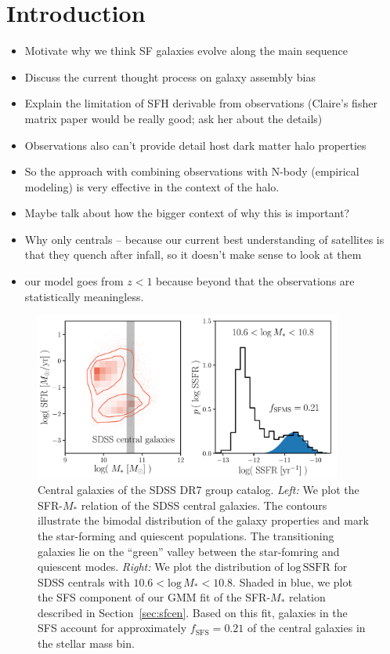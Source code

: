 \documentclass[12pt, letterpaper, preprint]{aastex}
\newcommand{\bitem}{\begin{itemize}}
\newcommand{\eitem}{\end{itemize}}
\begin{document}
\section{Introduction}
\bitem 
\item Motivate why we think SF galaxies evolve along the main sequence  
\item Discuss the current thought process on galaxy assembly bias 
\item Explain the limitation of SFH derivable from observations (Claire's fisher matrix paper would be really good; ask her about the details) 
\item Observations also can't provide detail host dark matter halo properties
\item So the approach with combining observations with N-body (empirical modeling) is very effective in the context of the halo.
\item Maybe talk about how the bigger context of why this is important?  
\item Why only centrals -- because our current best understanding of satellites is that they quench after infall, so it doesn't make sense to look at them
\item our model goes from $z < 1$ because beyond that the observations are statistically meaningless.  
\eitem 

\begin{figure}
\begin{center}
\includegraphics[width=0.9\textwidth]{figs/groupcat.pdf}
    \caption{Central galaxies of the SDSS DR7 group catalog. \emph{Left:} We plot 
    the SFR-$M_*$ relation of the SDSS central galaxies. The contours illustrate the bimodal
    distribution of the galaxy properties and mark the star-forming and quiescent populations. 
    The transitioning galaxies lie on the ``green'' valley between the star-fomring and quiescent
    modes. %
    \emph{Right:} We plot the distribution of $\mathrm{log}\,\mathrm{SSFR}$ for SDSS centrals
    with $10.6 < \mathrm{log}\,M_* < 10.8$. Shaded in blue, we plot the SFS component of our 
    GMM fit of the SFR-$M_*$ relation described in Section~\ref{sec:sfcen}. Based on this fit, 
    galaxies in the SFS account for approximately $f_\mathrm{SFS} = 0.21$ of the central 
    galaxies in the stellar mass bin.} \label{fig:groupcat}
\end{center}
\end{figure}
\end{document}
